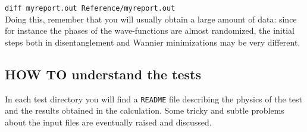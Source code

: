         {\tt diff myreport.out Reference/myreport.out } \\

     \noindent
     Doing this, remember that you will usually obtain a large amount of data:
     since for instance the phases of the wave-functions are almost
     randomized, the initial steps both in disentanglement and Wannier minimizations
     may be very different.

\subsection*{HOW TO understand the tests}
     In each test directory you will find a {\tt README} file describing the
     physics of the test and the results obtained in the calculation.
     Some tricky and subtle problems about the input files
     are eventually raised and discussed.
